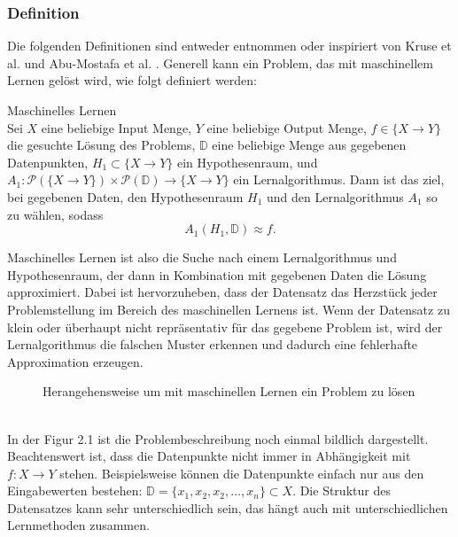 \documentclass[12pt,letterpaper,ngerman]{article}
\begin{document}
\subsubsection{Definition}
Die folgenden Definitionen sind entweder entnommen oder inspiriert
von Kruse et al. \cite{Kruse2022} und Abu-Mostafa et al. \cite{LFD}.
Generell kann ein Problem, 
das mit maschinellem Lernen gelöst wird, wie folgt definiert werden:
\begin{definition}{Maschinelles Lernen}
  \\
  Sei $X$ eine beliebige Input Menge, $Y$ eine beliebige Output Menge,
  $f \in \{X \to Y\}$ die gesuchte Lösung des Problems, 
  $\mathbb{D}$ eine beliebige Menge aus gegebenen Datenpunkten,
  $H_1 \subset \{X \to Y\}$ ein Hypothesenraum, und 
  $A_1: \mathcal{P}(\{X \to Y\}) \times 
  \mathcal{P}(\mathbb{D}) \to \{ X \to Y \} $
  ein Lernalgorithmus. Dann ist das ziel, bei gegebenen Daten,
  den Hypothesenraum $H_1$ und den Lernalgorithmus $A_1$ so zu wählen,
  sodass
  \[
    A_1(H_1, \mathbb{D}) \approx f.
  \]
\end{definition}
Maschinelles Lernen ist also die Suche nach einem Lernalgorithmus 
und Hypothesenraum, der dann in Kombination mit gegebenen Daten die
Lösung approximiert. Dabei ist hervorzuheben, dass der Datensatz 
das Herzstück jeder Problemstellung im Bereich des maschinellen 
Lernens ist. Wenn der Datensatz zu klein oder überhaupt nicht 
repräsentativ für das gegebene Problem  ist, wird der 
Lernalgorithmus die falschen Muster erkennen und dadurch eine 
fehlerhafte Approximation erzeugen.
\begin{figure}[H]
  \begin{center}
    \caption{Herangehensweise um mit maschinellen Lernen ein Problem zu lösen}
  \end{center}
\end{figure}
\pagebreak
\hfill\\
In der Figur 2.1 ist die Problembeschreibung noch einmal bildlich dargestellt.
Beachtenswert ist, dass die Datenpunkte nicht immer in Abhängigkeit mit 
$f: X \to Y$ stehen. Beispielsweise können die Datenpunkte einfach nur aus den
Eingabewerten bestehen: $\mathbb{D} = \{x_1,x_2,x_2, \dots, x_n\} \subset X$.
Die Struktur des Datensatzes kann sehr unterschiedlich sein, das hängt auch mit 
unterschiedlichen Lernmethoden zusammen.
\end{document}
